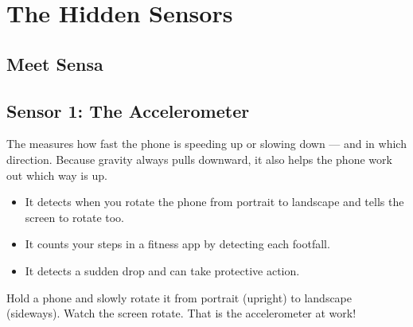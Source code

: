 
\chapter{The Hidden Sensors}


\section*{Meet Sensa}


\sectionrule

\section*{Sensor 1: The Accelerometer}

The  measures how fast the phone is speeding up or slowing down
— and in which direction.
Because gravity always pulls downward, it also helps the phone work out which way is up.

\begin{itemize}
  \item It detects when you rotate the phone from portrait to landscape
        and tells the screen to rotate too.
  \item It counts your steps in a fitness app by detecting each footfall.
  \item It detects a sudden drop and can take protective action.
\end{itemize}

\begin{experiment}
  Hold a phone and slowly rotate it from portrait (upright) to landscape (sideways).
  Watch the screen rotate. That is the accelerometer at work!
\end{experiment}

